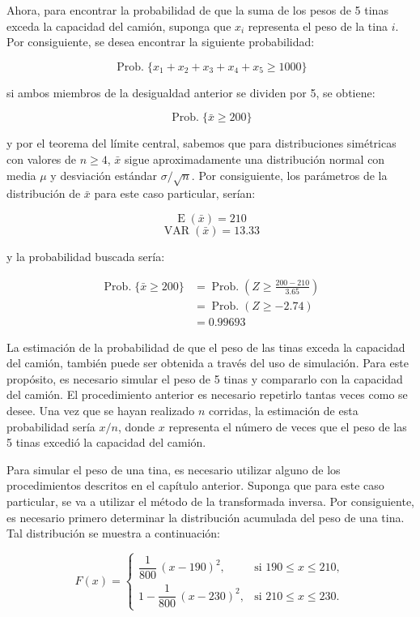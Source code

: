 \documentclass[11pt,letterpaper]{report}
\newcommand{\Prob}{\operatorname{Prob.}}
\newcommand{\E}{\operatorname{E}}
\newcommand{\VAR}{\operatorname{VAR}}
\begin{document}
Ahora, para encontrar la probabilidad de que la suma de los pesos de 5
tinas exceda la capacidad del camión, suponga que $x_i$ representa el peso
de la tina $i$. Por consiguiente, se desea encontrar la siguiente
probabilidad:

\[
\Prob\{x_1+x_2+x_3+x_4+x_5 \ge 1000\}
\]

si ambos miembros de la desigualdad anterior se dividen por 5, se obtiene:

\[
\Prob\{\bar{x} \ge 200\}
\]

y por el teorema del límite central, sabemos que para distribuciones
simétricas con valores de $n \ge 4$, $\bar{x}$ sigue aproximadamente una
distribución normal con media $\mu$ y desviación estándar
$\sigma/\sqrt{n}$. Por consiguiente, los parámetros de la distribución de
$\bar{x}$ para este caso particular, serían:

\[
\E(\bar{x}) = 210
\]
\[
\VAR(\bar{x}) = 13.33
\]

y la probabilidad buscada sería:

\begin{align*}
\Prob\{\bar{x} \ge 200\} &= \Prob\!\left(Z \ge \frac{200-210}{3.65}\right)\\
&= \Prob(Z \ge -2.74)\\
&= 0.99693
\end{align*}

La estimación de la probabilidad de que el peso de las tinas exceda la
capacidad del camión, también puede ser obtenida a través del uso de
simulación. Para este propósito, es necesario simular el peso de 5 tinas y
compararlo con la capacidad del camión. El procedimiento anterior es
necesario repetirlo tantas veces como se desee. Una vez que se hayan
realizado $n$ corridas, la estimación de esta probabilidad sería $x/n$,
donde $x$ representa el número de veces que el peso de las 5 tinas excedió
la capacidad del camión.

Para simular el peso de una tina, es necesario utilizar alguno de los
procedimientos descritos en el capítulo anterior. Suponga que para este
caso particular, se va a utilizar el método de la transformada inversa.
Por consiguiente, es necesario primero determinar la distribución
acumulada del peso de una tina. Tal distribución se muestra a
continuación:

\[
F(x)=
\begin{cases}
\dfrac{1}{800}\,(x-190)^{2}, & \text{si } 190 \le x \le 210,\\[10pt]
1-\dfrac{1}{800}\,(x-230)^{2}, & \text{si } 210 \le x \le 230.
\end{cases}
\]
\end{document}
